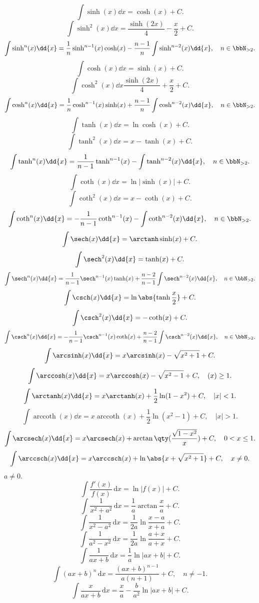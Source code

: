 \documentclass[a4paper,12pt]{report}
\begin{document}
\begin{itemize}
\begin{itemize}
\[\int\sinh(x)\dd{x}=\cosh(x)+C.\]
\[\int\sinh^2(x)\dd{x}=\frac{\sinh(2x)}{4}-\frac{x}{2}+C.\]
\[\int\sinh^n(x)\dd{x}=\frac{1}{n}\sinh^{n-1}(x)\cosh(x)-\frac{n-1}{n}\int\sinh^{n-2}(x)\dd{x},\quad n\in\bbN_{>2}.\]
\[\int\cosh(x)\dd{x}=\sinh(x)+C.\]
\[\int\cosh^2(x)\dd{x}\frac{\sinh(2x)}{4}+\frac{x}{2}+C.\]
\[\int\cosh^n(x)\dd{x}=\frac{1}{n}\cosh^{n-1}(x)\sinh(x)+\frac{n-1}{n}\int\cosh^{n-2}(x)\dd{x},\quad n\in\bbN_{>2}.\]
\[\int\tanh(x)\dd{x}=\ln\cosh(x)+C.\]
\[\int\tanh^2(x)\dd{x}=x-\tanh(x)+C.\]
\[\int\tanh^n(x)\dd{x}=\frac{1}{n-1}\tanh^{n-1}(x)-\int\tanh^{n-2}(x)\dd{x},\quad n\in\bbN_{>2}.\]
\[\int\coth(x)\dd{x}=\ln|\sinh(x)|+C.\]
\[\int\coth^2(x)\dd{x}=x-\coth(x)+C.\]
\[\int\coth^n(x)\dd{x}=-\frac{1}{n-1}\coth^{n-1}(x)-\int\coth^{n-2}(x)\dd{x},\quad n\in\bbN_{>2}.\]
\[\int\sech(x)\dd{x}=\arctanh\sinh(x)+C.\]
\[\int\sech^2(x)\dd{x}=\tanh(x)+C.\]
\[\int\sech^n(x)\dd{x}=\frac{1}{n-1}\sech^{n-1}(x)\tanh(x)+\frac{n-2}{n-1}\int\sech^{n-2}(x)\dd{x},\quad n\in\bbN_{>2}.\]
\[\int\csch(x)\dd{x}=\ln\abs{\tanh\frac{x}{2}}+C.\]
\[\int\csch^2(x)\dd{x}=-\coth(x)+C.\]
\[\int\csch^n(x)\dd{x}=-\frac{1}{n-1}\csch^{n-1}(x)\coth(x)+\frac{n-2}{n-1}\int\csch^{n-2}(x)\dd{x},\quad n\in\bbN_{>2}.\]
\[\int\arcsinh(x)\dd{x}=x\arcsinh(x)-\sqrt{x^2+1}+C.\]
\[\int\arccosh(x)\dd{x}=x\arccosh(x)-\sqrt{x^2-1}+C,\quad(x)\geq 1.\]
\[\int\arctanh(x)\dd{x}=x\arctanh(x)+\frac{1}{2}\ln(1-x^2)+C,\quad|x|<1.\]
\[\int\operatorname{arccoth}(x)\dd{x}=x\operatorname{arccoth}(x)+\frac{1}{2}\ln(x^2-1)+C,\quad|x|>1.\]
\[\int\arcsech(x)\dd{x}=x\arcsech(x)+\arctan\qty(\frac{\sqrt{1-x^2}}{x})+C,\quad 0<x\leq 1.\]
\[\int\arccsch(x)\dd{x}=x\arccsch(x)+\ln\abs{x+\sqrt{x^2+1}}+C,\quad x\neq 0.\]
$a\neq 0$.
\[\int\frac{f'(x)}{f(x)}\,\mathrm{d}x=\ln|f(x)|+C.\]
\[\int\frac{1}{x^2+a^2}\,\mathrm{d}x=\frac{1}{a}\arctan\frac{x}{a}+C.\]
\[\int\frac{1}{x^2-a^2}\,\mathrm{d}x=\frac{1}{2a}\ln\frac{x-a}{x+a}+C.\]
\[\int\frac{1}{a^2-x^2}\,\mathrm{d}x=\frac{1}{2a}\ln\frac{a+x}{a+x}+C.\]
\[\int\frac{1}{ax+b}\,\mathrm{d}x=\frac{1}{a}\ln|ax+b|+C.\]
\[\int(ax+b)^n\,\mathrm{d}x=\frac{(ax+b)^{n-1}}{a(n+1)}+C,\quad n\neq -1.\]
\[\int\frac{x}{ax+b}\,\mathrm{d}x=\frac{x}{a}-\frac{b}{a^2}\ln|ax+b|+C.\]

\end{itemize}
\end{itemize}
\end{document}
